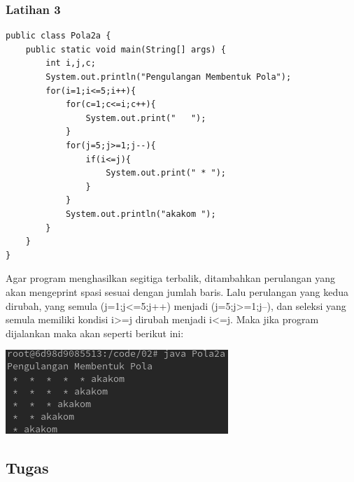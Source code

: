 \documentclass[a4paper,12pt]{article}
\begin{document}
\subsubsection{Latihan 3}
\begin{center}
    \begin{lstlisting}
public class Pola2a {
    public static void main(String[] args) {
        int i,j,c;
        System.out.println("Pengulangan Membentuk Pola");
        for(i=1;i<=5;i++){
            for(c=1;c<=i;c++){
                System.out.print("   ");
            }
            for(j=5;j>=1;j--){
                if(i<=j){
                    System.out.print(" * ");
                }
            }
            System.out.println("akakom ");
        }
    }
}
    \end{lstlisting}
\end{center}
Agar program menghasilkan segitiga terbalik, ditambahkan perulangan yang akan mengeprint spasi sesuai dengan jumlah baris. Lalu perulangan yang kedua dirubah, yang semula (j=1;j<=5;j++) 
menjadi (j=5;j>=1;j--), dan seleksi yang semula memiliki kondisi i>=j dirubah menjadi i<=j. Maka jika program dijalankan maka akan seperti berikut ini:\\
\begin{center}
    \includegraphics[scale=.7]{13.png}
\end{center}

\newpage

\subsection{Tugas}
\end{document}
